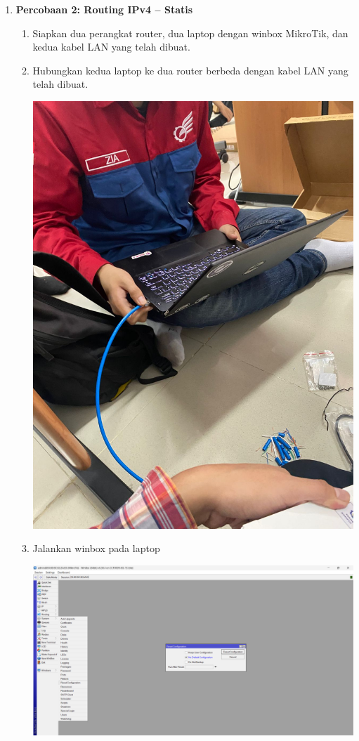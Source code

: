 \begin{enumerate}
\begin{enumerate}
\begin{center}
        \end{center}
    \end{enumerate}
    \item \textbf{Percobaan 2: Routing IPv4 -- Statis}
    \begin{enumerate}
        \item Siapkan dua perangkat router, dua laptop dengan winbox 
        MikroTik, dan kedua kabel LAN yang telah dibuat.
        \item Hubungkan kedua laptop ke dua router berbeda dengan kabel LAN 
        yang telah dibuat.
        \begin{center}
		    \includegraphics[scale=0.1]{P1/img/1-7.jpg}
        \end{center}
        \item Jalankan winbox pada laptop 
        \begin{center}
		    \includegraphics[scale=0.17]{P1/img/1-11.png}

\end{center}
\end{enumerate}
\end{enumerate}
